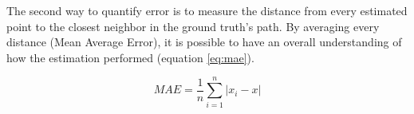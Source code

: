 The second way to quantify error is to measure the distance from every estimated point to the closest neighbor in the ground truth's path. By averaging every distance (Mean Average Error), it is possible to have an overall understanding of how the estimation performed (equation \ref{eq:mae}).

\begin{figure}[!h]
    \centering
    \begin{subfigure}{0.75\textwidth}
        \centering
        \resizebox{1\linewidth}{!}{}
        \label{fig:square3D_error}
    \end{subfigure}


    \begin{subfigure}{0.75\textwidth}
        \centering
        \resizebox{1\linewidth}{!}{}
        \label{fig:square3D_point}
    \end{subfigure}
    \label{fig:error_methods_3D}
\end{figure}


\begin{equation}
    MAE = \frac{1}{n}\sum_{i = 1}^{n} \left\lvert x_i - x\right\rvert
    \label{eq:mae}
\end{equation}

